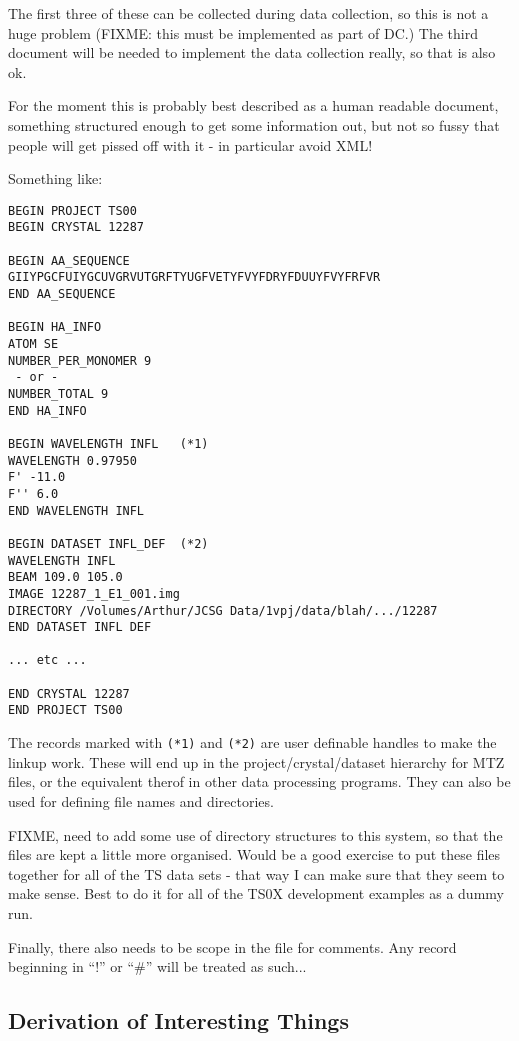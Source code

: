 \documentclass[a4paper, 11pt]{article}
\begin{document}
\noindent
The first three of these can be collected during data collection, so this is
not a huge problem (FIXME: this must be implemented as part of DC.) The
third document will be needed to implement the data collection really, so
that is also ok.

For the moment this is probably best described as a human readable document,
something structured enough to get some information out, but not so fussy
that people will get pissed off with it - in particular avoid XML!

Something like:

\begin{verbatim}
BEGIN PROJECT TS00
BEGIN CRYSTAL 12287

BEGIN AA_SEQUENCE
GIIYPGCFUIYGCUVGRVUTGRFTYUGFVETYFVYFDRYFDUUYFVYFRFVR
END AA_SEQUENCE

BEGIN HA_INFO
ATOM SE
NUMBER_PER_MONOMER 9
 - or -
NUMBER_TOTAL 9
END HA_INFO

BEGIN WAVELENGTH INFL   (*1)
WAVELENGTH 0.97950
F' -11.0
F'' 6.0
END WAVELENGTH INFL

BEGIN DATASET INFL_DEF  (*2)
WAVELENGTH INFL
BEAM 109.0 105.0
IMAGE 12287_1_E1_001.img
DIRECTORY /Volumes/Arthur/JCSG Data/1vpj/data/blah/.../12287
END DATASET INFL DEF

... etc ...

END CRYSTAL 12287
END PROJECT TS00
\end{verbatim}

\noindent
The records marked with \verb|(*1)| and \verb|(*2)| are user definable handles
to make the linkup work. These will end up in the project/crystal/dataset
hierarchy for MTZ files, or the equivalent therof in other data processing
programs. They can also be used for defining file names and directories.

FIXME, need to add some use of directory structures to this system,
so that the files are kept a little more organised. Would be a good 
exercise to put these files together for all of the TS data sets -
that way I can make sure that they seem to make sense. Best to do it 
for all of the TS0X development examples as a dummy run.

Finally, there also needs to be scope in the file for comments. Any record
beginning in ``!'' or ``\#'' will be treated as such...

\subsection{Derivation of Interesting Things}
\end{document}
